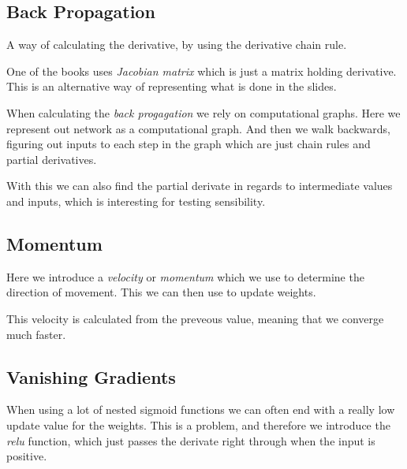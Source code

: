 \subsection{Back Propagation}

A way of calculating the derivative, by using the derivative chain rule.

One of the books uses \emph{Jacobian matrix} which is just a matrix holding derivative.
This is an alternative way of representing what is done in the slides.

When calculating the \emph{back progagation} we rely on computational graphs.
Here we represent out network as a computational graph.
And then we walk backwards, figuring out inputs to each step in the graph which are just chain rules and partial derivatives.

With this we can also find the partial derivate in regards to intermediate values and inputs, which is interesting for testing
sensibility.

\subsection{Momentum}

Here we introduce a \emph{velocity} or \emph{momentum} which we use to determine the direction of movement.
This we can then use to update weights.

This velocity is calculated from the preveous value, meaning that we converge much faster.

\subsection{Vanishing Gradients}

When using a lot of nested sigmoid functions we can often end with a really low update value for the weights.
This is a problem, and therefore we introduce the \emph{relu} function, which just passes the derivate right through when the input is positive.


